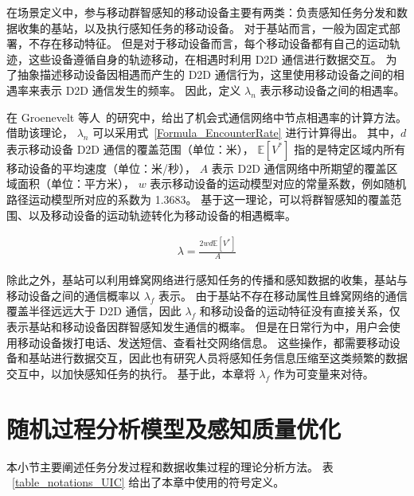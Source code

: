 在场景定义中，参与移动群智感知的移动设备主要有两类：负责感知任务分发和数据收集的基站，以及执行感知任务的移动设备。
对于基站而言，一般为固定式部署，不存在移动特征。
但是对于移动设备而言，每个移动设备都有自己的运动轨迹，这些设备遵循自身的轨迹移动，在相遇时利用 D2D 通信进行数据交互。
为了抽象描述移动设备因相遇而产生的 D2D 通信行为，这里使用移动设备之间的相遇率来表示 D2D 通信发生的频率。
因此，定义 $\lambda_n$ 表示移动设备之间的相遇率。

在 Groenevelt 等人~\cite{DBLP:journals/pe/GroeneveltNK05}的研究中，给出了机会式通信网络中节点相遇率的计算方法。
借助该理论， $\lambda_n$ 可以采用式~\eqref{Formula_EncounterRate} 进行计算得出。
其中，$d$ 表示移动设备 D2D 通信的覆盖范围（单位：米），
$\mathbb{E}[V^*]$ 指的是特定区域内所有移动设备的平均速度（单位：米/秒），
$A$ 表示 D2D 通信网络中所期望的覆盖区域面积（单位：平方米），
$w$ 表示移动设备的运动模型对应的常量系数，例如随机路径运动模型所对应的系数为 1.3683。
基于这一理论，可以将群智感知的覆盖范围、以及移动设备的运动轨迹转化为移动设备的相遇概率。

\vspace{-1em}
\begin{equation}
  \label{Formula_EncounterRate}
  \begin{gathered}
  \lambda = \frac{2 w d \mathbb{E}[V^*]}{A}
  \end{gathered}
\end{equation}

除此之外，基站可以利用蜂窝网络进行感知任务的传播和感知数据的收集，基站与移动设备之间的通信概率以 $\lambda_f$ 表示。
由于基站不存在移动属性且蜂窝网络的通信覆盖半径远远大于 D2D 通信，因此 $\lambda_f$ 和移动设备的运动特征没有直接关系，仅表示基站和移动设备因群智感知发生通信的概率。
但是在日常行为中，用户会使用移动设备拨打电话、发送短信、查看社交网络信息。
这些操作，都需要移动设备和基站进行数据交互，因此也有研究人员将感知任务信息压缩至这类频繁的数据交互中，以加快感知任务的执行。
基于此，本章将 $\lambda_f$ 作为可变量来对待。


\section{随机过程分析模型及感知质量优化}
本小节主要阐述任务分发过程和数据收集过程的理论分析方法。
表 ~\ref{table_notations_UIC} 给出了本章中使用的符号定义。

